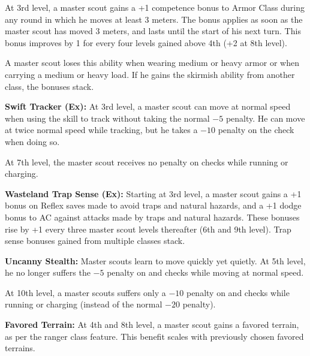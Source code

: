 {At 3rd level, a master scout gains a +1 competence bonus to Armor Class during any round in which he moves at least 3 meters. The bonus applies as soon as the master scout has moved 3 meters, and lasts until the start of his next turn. This bonus improves by 1 for every four levels gained above 4th (+2 at 8th level).

A master scout loses this ability when wearing medium or heavy armor or when carrying a medium or heavy load. If he gains the skirmish ability from another class, the bonuses stack.

\textbf{Swift Tracker (Ex):} At 3rd level, a master scout can move at normal speed when using the  skill to track without taking the normal $-5$ penalty. He can move at twice normal speed while tracking, but he takes a $-10$ penalty on the check when doing so.

At 7th level, the master scout receives no penalty on  checks while running or charging.

\textbf{Wasteland Trap Sense (Ex):} Starting at 3rd level, a master scout gains a +1 bonus on Reflex saves made to avoid traps and natural hazards, and a +1 dodge bonus to AC against attacks made by traps and natural hazards. These bonuses rise by +1 every three master scout levels thereafter (6th and 9th level). Trap sense bonuses gained from multiple classes stack.

\textbf{Uncanny Stealth:} Master scouts learn to move quickly yet quietly. At 5th level, he no longer suffers the $-5$ penalty on  and  checks while moving at normal speed.

At 10th level, a master scouts suffers only a $-10$ penalty on  and  checks while running or charging (instead of the normal $-20$ penalty).

\textbf{Favored Terrain:} At 4th and 8th level, a master scout gains a favored terrain, as per the ranger class feature. This benefit scales with previously chosen favored terrains.

}

